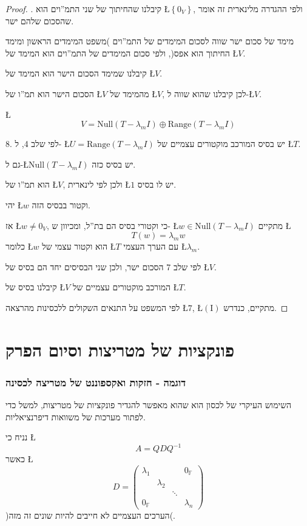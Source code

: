 \documentclass[english,hebrew]{article}
\begin{document}
\begin{proof}
{\endL}. קיבלנו שהחיתוך של שני התמ\textquotedblright וים
הוא \L{$\left\{ 0_{V}\right\} $}, ולפי ההגדרה מלינארית {\endL}
זה אומר שהסכום שלהם ישר.

מימד של סכום ישר שווה לסכום המימדים של התמ\textquotedblright וים )משפט
המימדים הראשון ומימד החיתוך הוא אפס(, ולפי {\endL} סכום המימדים
של התמ\textquotedblright וים הוא המימד של \L{$V$}.

קיבלנו שמימד הסכום הישר הוא המימד של \L{$V$}.

הסכום הישר הוא תמ\textquotedblright ו של \L{$V$} מהמימד של \L{$V$},
לכן קיבלנו שהוא שווה ל-\L{$V$}.

\L{%
\[
V=\text{Null}(T-\lambda_{m}I)\oplus\text{Range}(T-\lambda_{m}I)
\]
}%

8. לפי שלב 4, ל- \L{$U=\text{Range}(T-\lambda_{m}I)$} יש בסיס המורכב
מוקטורים עצמיים של \L{$T$}. 

גם ל-\L{$\text{Null}(T-\lambda_{m}I)$} יש בסיס כזה.

הוא תמ\textquotedblright ו של \L{$V$}, ולכן לפי לינארית \L{$1$}
יש לו בסיס.

יהי \L{$w$} וקטור בבסיס הזה.

אז \L{$w\neq0_{V}$}, כי וקטורי בסיס הם בת\textquotedblright ל, ומכיוון
ש- \L{$w\in\text{Null}(T-\lambda_{m}I)$} מתקיים \L{%
\[
T(w)=\lambda_{m}w
\]
}%
כלומר \L{$w$} הוא וקטור עצמי של \L{$T$} עם הערך העצמי \L{$\lambda_{m}$}.

לפי שלב 7 הסכום ישר, ולכן שני הבסיסים יחד הם בסיס של \L{$V$}.

קיבלנו בסיס של \L{$V$} המורכב מוקטורים עצמיים של \L{$T$}. 

לפי המשפט על התנאים השקולים ללכסינות מהרצאה \L{$7$}, \L{$(\text{I})$}
מתקיים, כנדרש.
\end{proof}

\part{פונקציות של מטריצות וסיום הפרק}

\section{דוגמה - חזקות ואקספוננט של מטריצה לכסינה}

השימוש העיקרי של לכסון הוא שהוא מאפשר להגדיר פונקציות של מטריצות,
למשל כדי לפתור מערכות של משוואות דיפרנציאליות.

נניח כי \L{%
\[
A=QDQ^{-1}
\]
}%
כאשר \L{%
\[
D=\begin{pmatrix}\lambda_{1} &  &  & 0_{\mathbb{F}}\\
 & \lambda_{2}\\
 &  & \ddots\\
0_{\mathbb{F}} &  &  & \lambda_{n}
\end{pmatrix}
\]
}%
)הערכים העצמיים לא חייבים להיות שונים זה מזה(.
\end{document}
